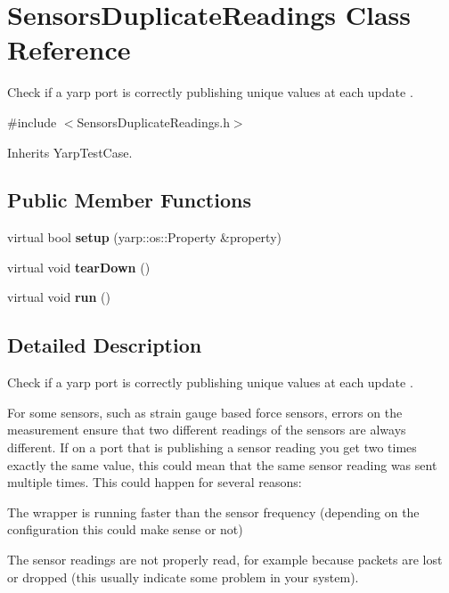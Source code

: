 \section{Sensors\-Duplicate\-Readings Class Reference}
\label{classSensorsDuplicateReadings}


Check if a yarp port is correctly publishing unique values at each update .  




{\ttfamily \#include $<$Sensors\-Duplicate\-Readings.\-h$>$}



Inherits Yarp\-Test\-Case.

\subsection*{Public Member Functions}
\begin{DoxyCompactItemize}
\item 
virtual bool {\bfseries setup} (yarp\-::os\-::\-Property \&property)\label{classSensorsDuplicateReadings_ab59f0ef1631d3e9e32319d7258cfb1f8}

\item 
virtual void {\bfseries tear\-Down} ()\label{classSensorsDuplicateReadings_a985c191f7133ff39409a5d30f93316cf}

\item 
virtual void {\bfseries run} ()\label{classSensorsDuplicateReadings_a4c03abe12e3dadaaa13a26a537a897e3}

\end{DoxyCompactItemize}


\subsection{Detailed Description}
Check if a yarp port is correctly publishing unique values at each update . 

For some sensors, such as strain gauge based force sensors, errors on the measurement ensure that two different readings of the sensors are always different. If on a port that is publishing a sensor reading you get two times exactly the same value, this could mean that the same sensor reading was sent multiple times. This could happen for several reasons\-:
\begin{DoxyItemize}
\item The wrapper is running faster than the sensor frequency (depending on the configuration this could make sense or not)
\item The sensor readings are not properly read, for example because packets are lost or dropped (this usually indicate some problem in your system).
\end{DoxyItemize}

